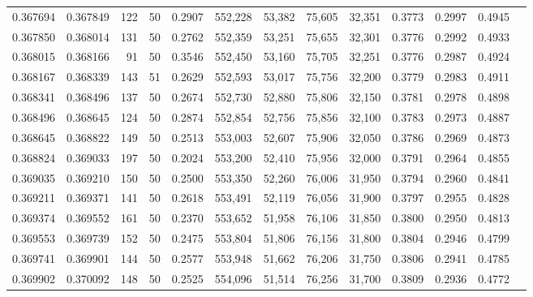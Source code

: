 \begin{tabular}{rrrrrrrrrrrrr}
0.367694 & 0.367849 &   122 &  50 &                                     0.2907 & 552,228 &  53,382 &  75,605 &  32,351 & 0.3773 & 0.2997 & 0.4945 \\
0.367850 & 0.368014 &   131 &  50 &                                     0.2762 & 552,359 &  53,251 &  75,655 &  32,301 & 0.3776 & 0.2992 & 0.4933 \\
0.368015 & 0.368166 &    91 &  50 &                                     0.3546 & 552,450 &  53,160 &  75,705 &  32,251 & 0.3776 & 0.2987 & 0.4924 \\
0.368167 & 0.368339 &   143 &  51 &                                     0.2629 & 552,593 &  53,017 &  75,756 &  32,200 & 0.3779 & 0.2983 & 0.4911 \\
0.368341 & 0.368496 &   137 &  50 &                                     0.2674 & 552,730 &  52,880 &  75,806 &  32,150 & 0.3781 & 0.2978 & 0.4898 \\
0.368496 & 0.368645 &   124 &  50 &                                     0.2874 & 552,854 &  52,756 &  75,856 &  32,100 & 0.3783 & 0.2973 & 0.4887 \\
0.368645 & 0.368822 &   149 &  50 &                                     0.2513 & 553,003 &  52,607 &  75,906 &  32,050 & 0.3786 & 0.2969 & 0.4873 \\
0.368824 & 0.369033 &   197 &  50 &                                     0.2024 & 553,200 &  52,410 &  75,956 &  32,000 & 0.3791 & 0.2964 & 0.4855 \\
0.369035 & 0.369210 &   150 &  50 &                                     0.2500 & 553,350 &  52,260 &  76,006 &  31,950 & 0.3794 & 0.2960 & 0.4841 \\
0.369211 & 0.369371 &   141 &  50 &                                     0.2618 & 553,491 &  52,119 &  76,056 &  31,900 & 0.3797 & 0.2955 & 0.4828 \\
0.369374 & 0.369552 &   161 &  50 &                                     0.2370 & 553,652 &  51,958 &  76,106 &  31,850 & 0.3800 & 0.2950 & 0.4813 \\
0.369553 & 0.369739 &   152 &  50 &                                     0.2475 & 553,804 &  51,806 &  76,156 &  31,800 & 0.3804 & 0.2946 & 0.4799 \\
0.369741 & 0.369901 &   144 &  50 &                                     0.2577 & 553,948 &  51,662 &  76,206 &  31,750 & 0.3806 & 0.2941 & 0.4785 \\
0.369902 & 0.370092 &   148 &  50 &                                     0.2525 & 554,096 &  51,514 &  76,256 &  31,700 & 0.3809 & 0.2936 & 0.4772 \\

\end{tabular}
